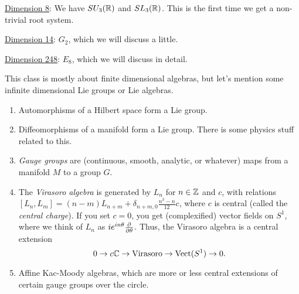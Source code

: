  \underline{Dimension 8}: We have $SU_3(\mathbb{R})$ and $SL_3(\mathbb{R})$. This is the first time
 we get a non-trivial root system.

 \underline{Dimension 14}: $G_2$, which we will discuss a little.

 \underline{Dimension 248}: $E_8$, which we will discuss in detail.

 \smallskip
 This class is mostly about finite dimensional algebras, but let's mention some
 infinite dimensional Lie groups or Lie algebras.
 \begin{enumerate}
   \item Automorphisms of a Hilbert space form a Lie group.

   \item Diffeomorphisms of a manifold form a Lie group. There is some physics stuff
   related to this.

   \item \emph{Gauge groups} are (continuous, smooth,
   analytic, or whatever) maps from a manifold $M$ to a group $G$.

   \item The \emph{Virasoro algebra} is generated by $L_n$ for
   $n\in \mathbb{Z}$ and $c$, with relations $[L_n,L_m]=(n-m) L_{n+m} +
   \delta_{n+m,0}\frac{n^3-n}{12}c$, where $c$ is central (called the \emph{central
   charge}). If you set $c=0$, you get (complexified) vector fields on $S^1$, where we
   think of $L_n$ as $ie^{in\theta}\frac{\partial }{\partial \theta}$. Thus, the Virasoro algebra is a
   central extension
   \[
     0\to c\mathbb{C} \to \text{Virasoro}\to \text{Vect}(S^1)\to 0.
   \]

   \item Affine Kac-Moody algebras, which are more or less central extensions of
   certain gauge groups over the circle.
 \end{enumerate}
